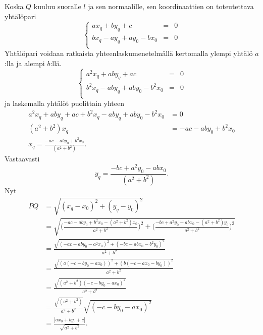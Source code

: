 Koska $Q$ kuuluu suoralle $l$ ja sen normaalille, sen koordinaattien on toteutettava yhtälöpari
\[
\left\{    
    \begin{array}{rcl}
        ax_q + by_q + c &=&0 \\
        bx_q-ay_q+ay_0-bx_0 &=& 0 \\
    \end{array}
    \right.
\]
Yhtälöpari voidaan ratkaista yhteenlaskumenetelmällä kertomalla ylempi yhtälö $a$:lla ja alempi $b$:llä.
\[
\left\{    
    \begin{array}{rcl}
        a^2x_q + aby_q + ac &=&0 \\
        b^2x_q-aby_q+aby_0-b^2x_0 &=& 0 \\
    \end{array}
    \right.
\]
ja laskemalla yhtälöt puolittain yhteen
\begin{align*}
 a^2x_q + aby_q + ac + b^2x_q-aby_q+aby_0-b^2x_0 &= 0 \\
 (a^2+b^2)x_q &= -ac-aby_0+b^2x_0 \\
 x_q = \frac{-ac-aby_0+b^2x_0}{(a^2+b^2)}.
\end{align*}
Vastaavasti
\[
y_q = \frac{-bc+a^2y_0-abx_0}{(a^2+b^2)}.
\]
Nyt
\begin{align*}
PQ &= \sqrt{(x_q-x_0)^2+(y_q-y_0)^2} \\
&= \sqrt{\Big(\frac{-ac-aby_0+b^2x_0-(a^2+b^2)x_0}{a^2+b^2}\Big)^2+\Big(\frac{-bc+a^2y_0-abx_0-(a^2+b^2)y_0}{a^2+b^2}\Big)^2} \\
& = \frac{\sqrt{(-ac-aby_0-a^2x_0)^2+(-bc-abx_0-b^2 y_0)^2}}{a^2+b^2} \\
& = \frac{\sqrt{(a(-c-by_0-ax_0))^2+(b(-c-ax_0-by_0))^2}}{a^2+b^2} \\
& = \frac{\sqrt{(a^2+b^2)(-c-by_0-ax_0)^2}}{a^2+b^2} \\
& = \frac{\sqrt{(a^2+b^2)}}{a^2+b^2}\sqrt{(-c-by_0-ax_0)^2} \\
& = \frac{|ax_0+by_0+c|}{\sqrt{a^2+b^2}}.
\end{align*}
